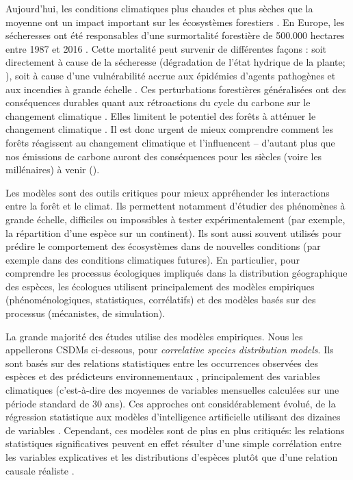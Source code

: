 Aujourd'hui, les conditions climatiques plus chaudes et plus sèches que la moyenne ont un impact important sur les écosystèmes forestiers \citep{Allen2010, Senf2020}. En Europe, les sécheresses ont été responsables d'une surmortalité forestière de 500.000 hectares entre 1987 et 2016 \citep{Senf2020}. Cette mortalité peut survenir de différentes façons : soit directement à cause de la sécheresse (dégradation de l'état hydrique de la plante; \citealp{Hartmann2018}), soit à cause d'une vulnérabilité accrue aux épidémies d'agents pathogènes et aux incendies à grande échelle \citep{Breshears2005, Seidl2017, Sommerfeld2018, Jactel2012, Mantgem2009, Hember2016}. Ces perturbations forestières généralisées ont des conséquences durables quant aux rétroactions du cycle du carbone sur le changement climatique \citep{Schwalm2012, Ciais2005, Thom2016, Kannenberg2020, Kurz2008}. Elles limitent le potentiel des forêts à atténuer le changement climatique \citep{Anderegg2020}. Il est donc urgent de mieux comprendre comment les forêts réagissent au changement climatique et l'influencent -- d'autant plus que nos émissions de carbone auront des conséquences pour les siècles (voire les millénaires) à venir ().

Les modèles sont des outils critiques pour mieux appréhender les interactions entre la forêt et le climat. Ils permettent notamment d'étudier des phénomènes à grande échelle, difficiles ou impossibles à tester expérimentalement (par exemple, la répartition d'une espèce sur un continent). Ils sont aussi souvent utilisés pour prédire le comportement des écosystèmes dans de nouvelles conditions (par exemple dans des conditions climatiques futures). En particulier, pour comprendre les processus écologiques impliqués dans la distribution géographique des espèces, les écologues utilisent principalement des modèles empiriques (phénoménologiques, statistiques, corrélatifs) et des modèles basés sur des processus (mécanistes, de simulation).

La grande majorité des études utilise des modèles empiriques. Nous les appellerons CSDMs ci-dessous, pour \emph{correlative species distribution models}. Ils sont basés sur des relations statistiques entre les occurrences observées des espèces et des prédicteurs environnementaux \citep{Elith2009}, principalement des variables climatiques (c'est-à-dire des moyennes de variables mensuelles calculées sur une période standard de 30 ans). Ces approches ont considérablement évolué, de la régression statistique \citep{Thuiller2009} aux modèles d'intelligence artificielle utilisant des dizaines de variables \citep{Steiner2024}. Cependant, ces modèles sont de plus en plus critiqués: les relations statistiques significatives peuvent en effet résulter d'une simple corrélation entre les variables explicatives et les distributions d'espèces plutôt que d'une relation causale réaliste \citep{Bahn2007, Journe2020, Fourcade2018}.

